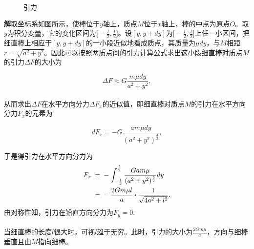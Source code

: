 \begin{figure}[H]
\centering
  
  \caption{引力}
  \label{引力}
\end{figure}

\textbf{解\;}取坐标系如图所示，使棒位于$y$轴上，质点$M$位于$x$轴上，棒的中点为原点$O$。取$y$为积分变量，它的变化区间为$\big[-\frac{l}{2}, \frac{l}{2} \big]$。设$[y, y+dy]$为$\big[-\frac{l}{2}, \frac{l}{2} \big]$上任一小区间，把细直棒上相应于$[y,y+dy]$的一小段近似地看成质点，其质量为$\mu dy$，与$M$相距$\displaystyle r=\sqrt{a^2+y^2}$。因此可以按照两质点间的引力计算公式求出这小段细直棒对质点$M$的引力$\Delta F$的大小为

\begin{equation}
  \Delta F \approx G\frac{m\mu dy}{a^2+y^2},
\end{equation}

\paragraph{}
从而求出$\Delta F$在水平方向分力$\Delta F_x$的近似值，即细直棒对质点$M$的引力在水平方向分力$F_x$的元素为

\begin{equation}
  dF_x = -G\frac{am\mu dy}{(a^2+y^2)^{\frac{3}{2}}},
\end{equation}

于是得引力在水平方向分力为
\begin{align}
  F_x \;=&\; - \int_{-\frac{l}{2}}^{\frac{l}{2}} \frac{Gam\mu}{(a^2+y^2)^{\frac{3}{2}}} dy \\
  \;=&\; -\frac{2Gm\mu l}{a} \bigcdot \frac{1}{\sqrt{4a^2+l^2}}.
\end{align}
由对称性知，引力在铅直方向分力为$F_y=0$.

\paragraph{}
当细直棒的长度$l$很大时，可视$l$趋于无穷。此时，引力的大小为$\displaystyle \frac{2Gm\mu}{a}$，方向与细棒垂直且由$M$指向细棒。

